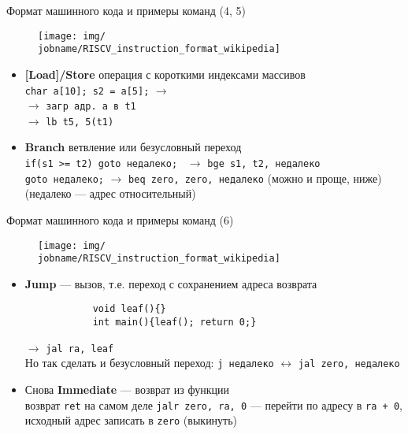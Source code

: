 \documentclass[xetex,aspectratio=43]{beamer}
\begin{document}
\begin{frame}[fragile]{Формат машинного кода и примеры команд (4, 5)}
    \begin{figure}
        \texttt{[image: img/\\jobname/RISCV\_instruction\_format\_wikipedia]}
    \end{figure}

    \begin{itemize}
        \tightlist
        \item \textbf{[Load]/Store} операция с короткими индексами массивов\\
        \texttt{char a[10]; s2 = a[5];} $\rightarrow$ \\
        $\rightarrow$ \texttt{загр адр. a в t1} \\
        {\color{white}$\rightarrow$} \texttt{lb t5, 5(t1)}
        \item \textbf{Branch} ветвление или безусловный переход\\
        \texttt{if(s1 >= t2) goto недалеко; } $\rightarrow$
        \texttt{bge s1, t2, недалеко}\\
        \texttt{goto недалеко;} $\rightarrow$
        \texttt{beq zero, zero, недалеко} (можно и проще, ниже)\\
        (недалеко --- адрес относительный)
    \end{itemize}
\end{frame}

\begin{frame}[fragile]{Формат машинного кода и примеры команд (6)}
    \begin{figure}
        \texttt{[image: img/\\jobname/RISCV\_instruction\_format\_wikipedia]}
    \end{figure}

    \begin{itemize}
        \tightlist
        \item \textbf{Jump} --- вызов, т.е. переход с сохранением адреса возврата\\
        \begin{verbatim}
            void leaf(){}
            int main(){leaf(); return 0;}
        \end{verbatim}
        $\rightarrow$ \texttt{jal ra, leaf}\\
        Но так сделать и безусловный переход: \texttt{j недалеко} $\leftrightarrow$ \texttt{jal zero, недалеко}
        \item Снова \textbf{Immediate} --- возврат из функции \\
        возврат \texttt{ret} на самом деле \texttt{jalr zero, ra, 0} --- перейти по
        адресу в \texttt{ra + 0}, исходный адрес записать в \texttt{zero} (выкинуть)
    \end{itemize}
\end{frame}
\end{document}
